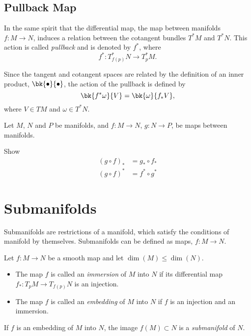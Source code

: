 \subsection{Pullback Map}

In the same spirit that the differential map, the map between manifolds $f:M\to N$, induces a relation between the cotangent bundles $T^*M$ and $T^*N$. This action is called \emph{pullback} and is denoted by $f^*$, where
\begin{equation}
  f^*: T^*_{f(p)}N \to T^*_p M.
\end{equation}

Since the tangent and cotangent spaces are related by the definition of an inner product, $\bk{\bullet}{\bullet}$, the action of the pullback is defined by 
\begin{equation}
  \bk{f^*\omega}{V} = \bk{\omega}{f_*V},
\end{equation}
where $V \in TM$ and $\omega \in T^*N$.

\begin{Ebox}
  Let $M$, $N$ and $P$ be manifolds, and $ f:M\to N$, $g:N\to P$,  be maps between manifolds. 

  Show
  \begin{align*}
    (g\circ f)_* &= g_*\circ f_*\\
    (g\circ f)^* &= f^*\circ g^*
  \end{align*}
\end{Ebox}

\section{Submanifolds}

Submanifolds are restrictions of a manifold, which satisfy the conditions of manifold by themselves. Submanifolds can be defined as maps, $f:M \to N$.

\begin{Def}
  Let $f:M\to N$ be a smooth map and let $\dim(M)\leq \dim(N)$.
  \begin{itemize}
  \item The map $f$ is called an \emph{immersion} of $M$ into $N$ if its differential map \mbox{$f_*:T_p M\to T_{f(p)}N$} is an injection.
  \item The map $f$ is called an \emph{embedding} of $M$ into $N$ if $f$ is an injection and an immersion.
  \end{itemize}
  If $f$ is an embedding of $M$ into $N$, the image $f(M)\subset N$ is a \emph{submanifold} of $N$.
\end{Def}

